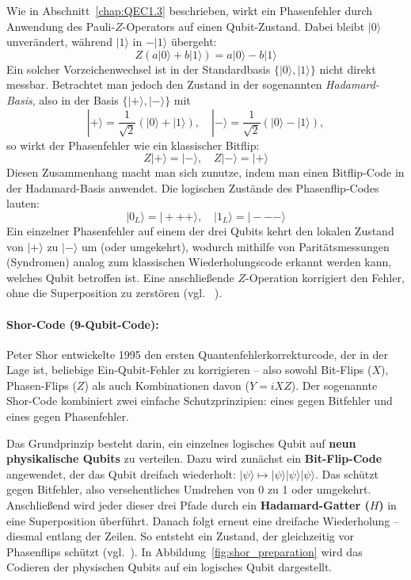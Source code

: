 Wie in Abschnitt~\ref{chap:QEC1.3} beschrieben, wirkt ein Phasenfehler durch Anwendung des Pauli-\(Z\)-Operators auf einen Qubit-Zustand. Dabei bleibt \(|0\rangle\) unverändert, während \(|1\rangle\) in \(-|1\rangle\) übergeht:
\[
Z(a|0\rangle + b|1\rangle) = a|0\rangle - b|1\rangle
\]
Ein solcher Vorzeichenwechsel ist in der Standardbasis \(\{|0\rangle, |1\rangle\}\) nicht direkt messbar. Betrachtet man jedoch den Zustand in der sogenannten \emph{Hadamard-Basis}, also in der Basis \(\{|+\rangle, |-\rangle\}\) mit
\[
|+\rangle = \frac{1}{\sqrt{2}}(|0\rangle + |1\rangle), \quad |-\rangle = \frac{1}{\sqrt{2}}(|0\rangle - |1\rangle),
\]
so wirkt der Phasenfehler wie ein klassischer Bitflip:
\[
Z|+\rangle = |-\rangle, \quad Z|-\rangle = |+\rangle
\]
Diesen Zusammenhang macht man sich zunutze, indem man einen Bitflip-Code in der Hadamard-Basis anwendet. Die logischen Zustände des Phasenflip-Codes lauten:
\[
|0_L\rangle = |+++\rangle, \quad |1_L\rangle = |---\rangle
\]
Ein einzelner Phasenfehler auf einem der drei Qubits kehrt den lokalen Zustand von \(|+\rangle\) zu \(|-\rangle\) um (oder umgekehrt), wodurch mithilfe von Paritätsmessungen (Syndromen) analog zum klassischen Wiederholungscode erkannt werden kann, welches Qubit betroffen ist. Eine anschließende \(Z\)-Operation korrigiert den Fehler, ohne die Superposition zu zerstören (vgl.~\cite[430-431]{nielsen_quantum_2010} \cite[4]{devitt_quantum_2013}).
\medskip
\paragraph{Shor-Code (9-Qubit-Code):}

Peter Shor entwickelte 1995 den ersten Quantenfehlerkorrekturcode, der in der Lage ist, beliebige Ein-Qubit-Fehler zu korrigieren – also sowohl Bit-Flips (\(X\)), Phasen-Flips (\(Z\)) als auch Kombinationen davon (\(Y = iXZ\)). Der sogenannte Shor-Code kombiniert zwei einfache Schutzprinzipien: eines gegen Bitfehler und eines gegen Phasenfehler.

Das Grundprinzip besteht darin, ein einzelnes logisches Qubit auf \textbf{neun physikalische Qubits} zu verteilen. Dazu wird zunächst ein \textbf{Bit-Flip-Code} angewendet, der das Qubit dreifach wiederholt: \( |\psi\rangle \mapsto |\psi\rangle |\psi\rangle |\psi\rangle \). Das schützt gegen Bitfehler, also versehentliches Umdrehen von 0 zu 1 oder umgekehrt.
Anschließend wird jeder dieser drei Pfade durch ein \textbf{Hadamard-Gatter (\(H\))} in eine Superposition überführt. Danach folgt erneut eine dreifache Wiederholung – diesmal entlang der Zeilen. So entsteht ein Zustand, der gleichzeitig vor Phasenflips schützt (vgl.~\cite[10-11]{devitt_quantum_2013}).
In Abbildung~\ref{fig:shor_preparation} wird das Codieren der physischen Qubits auf ein logisches Qubit dargestellt.

